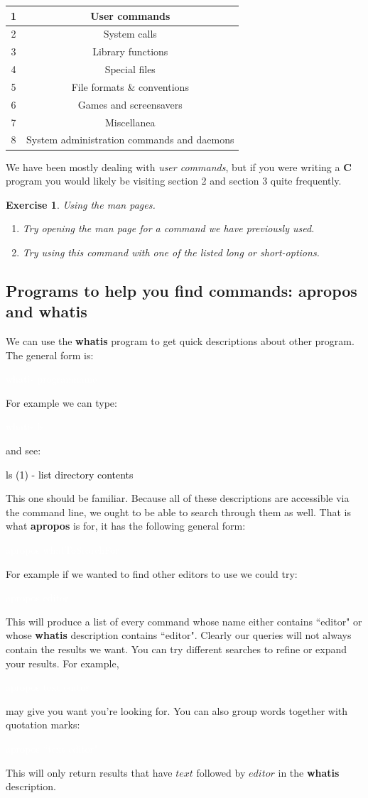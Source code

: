 \documentclass[oneside]{book}
\newcommand{\commandline}[1]{\begin{center} \colorbox{Dark}{\textcolor{white}{#1}} \end{center}}
\newcommand{\exampleout}[1]{\begin{center} \colorbox{Light}{\textcolor{black}{#1}} \end{center}}
\newtheorem{ex}{Exercise}[chapter]
\begin{document}
\begin{center}
    \begin{tabular}{|c|c|}
        \hline
	    1 & User commands \\
	    \hline
        2 & System calls \\
        \hline
        3 & Library functions \\
        \hline
        4 & Special files \\
        \hline
        5 & File formats \& conventions \\
        \hline
        6 & Games and screensavers \\
        \hline
        7 & Miscellanea \\
        \hline
        8 & System administration commands and daemons \\
        \hline
    \end{tabular}
\end{center}

We have been mostly dealing with \textit{user commands}, but if you were writing a \textbf{C} program you would likely be visiting section 2 and section 3 quite frequently.\\

\begin{ex} Using the man pages.
    \begin{enumerate}
        \item Try opening the man page for a command we have previously used.
        \item Try using this command with one of the listed long or short-options. 
    \end{enumerate}
\end{ex}

\subsection{Programs to help you find commands: \textbf{apropos} and \textbf{whatis}}
We can use the \textbf{whatis} program to get quick descriptions about other program. The general form is:
\commandline{whatis programname}
For example we can type:
\commandline{whatis ls}
and see:
\exampleout{ls (1)		- list directory contents}
This one should be familiar. Because all of these descriptions are accessible via the command line, we ought to be able to search through them as well.
That is what \textbf{apropos} is for, it has the following general form:
\commandline{apropos whatToSearchFor}
For example if we wanted to find other editors to use we could try:
\commandline{apropos editor}
This will produce a list of every command whose name either contains ``editor" or whose \textbf{whatis} description contains ``editor". Clearly our queries will not always contain the results we want. You can try different searches to refine or expand your results. For example,
\commandline{apropos text editor}
may give you want you're looking for. You can also group words together with quotation marks:
\commandline{apropos ``text editor"} 
This will only return results that have $text$ followed by $editor$ in the \textbf{whatis} description.
\end{document}
